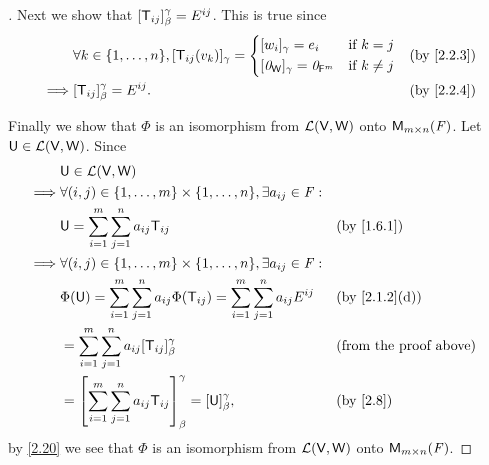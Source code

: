 \begin{proof}[]
	Next we show that \([\mathsf{T}_{i j}]_{\beta}^{\gamma} = E^{i j}\).
	This is true since
	\begin{align*}
		         & \forall k \in \set{1, \dots, n}, [\T_{i j}(v_k)]_{\gamma} = \begin{dcases}
			                                                                       [w_i]_{\gamma} = e_i                 & \text{if } k = j    \\
			                                                                       [\zv_{\W}]_{\gamma} = \zv_{\vs{F}^m} & \text{if } k \neq j
		                                                                       \end{dcases} &  & \by{2.2.3} \\
		\implies & [\T_{i j}]_{\beta}^{\gamma} = E^{i j}.                                       &  & \by{2.2.4}
	\end{align*}

	Finally we show that \(\Phi\) is an isomorphism from \(\mathcal{L}(\mathsf{V}, \mathsf{W})\) onto \(\ms\).
	Let \(\mathsf{U} \in \mathcal{L}(\mathsf{V}, \mathsf{W})\).
	Since
	\begin{align*}
		         & \U \in \ls(\V, \W)                                                                                                                                 \\
		\implies & \forall (i, j) \in \set{1, \dots, m} \times \set{1, \dots, n}, \exists a_{i j} \in \F :                                                            \\
		         & \U = \sum_{i = 1}^m \sum_{j = 1}^n a_{i j} \T_{i j}                                                             &  & \by{1.6.1}                    \\
		\implies & \forall (i, j) \in \set{1, \dots, m} \times \set{1, \dots, n}, \exists a_{i j} \in \F :                                                            \\
		         & \Phi(\U) = \sum_{i = 1}^m \sum_{j = 1}^n a_{i j} \Phi(\T_{i j}) = \sum_{i = 1}^m \sum_{j = 1}^n a_{i j} E^{i j} &  & \by{2.1.2}[d]                 \\
		         & = \sum_{i = 1}^m \sum_{j = 1}^n a_{i j} [\T_{i j}]_{\beta}^{\gamma}                                             &  & \text{(from the proof above)} \\
		         & = \br{\sum_{i = 1}^m \sum_{j = 1}^n a_{i j} \T_{i j}}_{\beta}^{\gamma} = [\U]_{\beta}^{\gamma},                 &  & \by{2.8}
	\end{align*}
	by \cref{2.20} we see that \(\Phi\) is an isomorphism from \(\mathcal{L}(\mathsf{V}, \mathsf{W})\) onto \(\ms\).
\end{proof}

